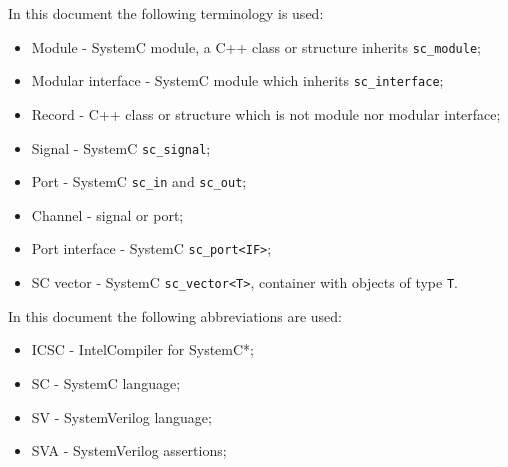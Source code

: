 In this document the following terminology is used:
%
\begin{itemize}
\item Module - SystemC module, a C++ class or structure inherits {\tt sc\_module};
\item Modular interface - SystemC module which inherits {\tt sc\_interface};
\item Record - C++ class or structure which is not module nor modular interface;
\item Signal - SystemC {\tt sc\_signal};
\item Port - SystemC {\tt sc\_in} and {\tt sc\_out};
\item Channel - signal or port;
\item Port interface - SystemC {\tt sc\_port<IF>};
\item SC vector - SystemC {\tt sc\_vector<T>}, container with objects of type {\tt T}.
\end{itemize}
%
In this document the following abbreviations are used:
%
\begin{itemize}
\item ICSC - Intel\textregistered Compiler for SystemC*;
\item SC - SystemC language;
\item SV - SystemVerilog language;
\item SVA - SystemVerilog assertions;
\end{itemize}




\ifdefined\INTEL

\else

\fi










